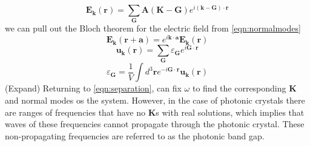 \begin{equation}
	\boldsymbol{E}_{\boldsymbol{k}}(\boldsymbol{r}) = \sum_{\boldsymbol{G}}\boldsymbol{A}(\boldsymbol{K}-\boldsymbol{G})e^{i(\boldsymbol{k}-\boldsymbol{G})\cdot \boldsymbol{r}}
	\label{eqn:normalmodes}
\end{equation}
we can pull out the Bloch theorem for the electric field from \eqref{eqn:normalmodes}
\begin{equation}
	\boldsymbol{E}_{\boldsymbol{k}}(\boldsymbol{r}+\boldsymbol{a}) = e^{i\boldsymbol{k}\cdot \boldsymbol{a}}\boldsymbol{E}_{\boldsymbol{k}}(\boldsymbol{r})
\end{equation}
\begin{equation}
	\boldsymbol{u_k}(\boldsymbol{r}) = \sum_{\boldsymbol{G}}\varepsilon_{\boldsymbol{G}}e^{i\boldsymbol{G}\cdot\boldsymbol{r}}
\end{equation}
\begin{equation}
	\varepsilon_{\boldsymbol{G}} = \frac{1}{V}\int d^3\boldsymbol{r}e^{-i\boldsymbol{G}\cdot\boldsymbol{r}}\boldsymbol{u_k}(\boldsymbol{r})
	\label{eqn:perm}
\end{equation}
(Expand)  Returning to \eqref{eqn:separation}, can fix $\omega$ to find the corresponding $\boldsymbol{K}$ and normal modes os the system. However, in the case of photonic crystals there are ranges of frequencies that  have no $\boldsymbol{K}$s with real solutions, which implies that waves of these frequencies cannot propagate through the photonic crystal. These non-propagating frequencies are referred to as the photonic band gap.


